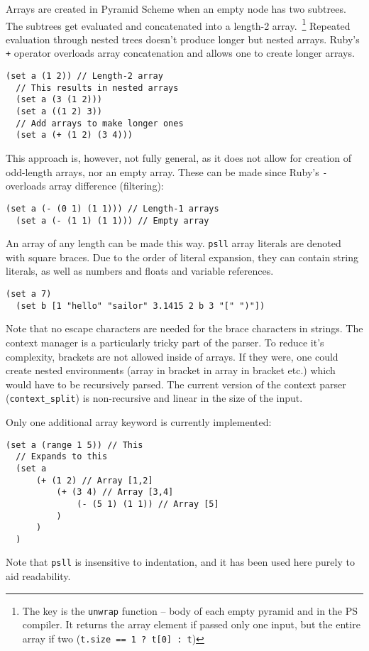 \documentclass[aip,jcp,reprint,footinbib]{revtex4-1}
\makeatletter
\let\tt\texttt
\newcommand\psll{\texttt{psll}\xspace}
\renewcommand\paragraph{\@startsection{paragraph}{4}{\parindent}{\parskip}{-1em}{\normalfont \normalsize \bfseries}}
\makeatother
\begin{document}
\paragraph{Array literals} Arrays are created in Pyramid Scheme when an empty node has two subtrees. The subtrees get evaluated and concatenated into a length-2 array.~\footnote{The key is the \tt{unwrap} function -- body of each empty pyramid and in the PS compiler. It returns the array element if passed only one input, but the entire array if two (\tt{t.size == 1 ? t[0] : t})} Repeated evaluation through nested trees doesn't produce longer but nested arrays. Ruby's \tt{+} operator overloads array concatenation and allows one to create longer arrays.
\begin{lstlisting}[language=psll,aboveskip=3pt,belowskip=-2pt,frame=none,numbers=none]
  (set a (1 2)) // Length-2 array
  // This results in nested arrays
  (set a (3 (1 2)))
  (set a ((1 2) 3))
  // Add arrays to make longer ones
  (set a (+ (1 2) (3 4)))
\end{lstlisting}
This approach is, however, not fully general, as it does not allow for creation of odd-length arrays, nor an empty array. These can be made since Ruby's \tt{-} overloads array difference (filtering):
\begin{lstlisting}[language=psll,aboveskip=3pt,belowskip=-2pt,frame=none,numbers=none]
  (set a (- (0 1) (1 1))) // Length-1 arrays
  (set a (- (1 1) (1 1))) // Empty array
\end{lstlisting}
An array of any length can be made this way. \psll array literals are denoted with square braces. Due to the order of literal expansion, they can contain string literals, as well as numbers and floats and variable references.
\begin{lstlisting}[language=psll,aboveskip=3pt,belowskip=-2pt,frame=none,numbers=none]
  (set a 7)
  (set b [1 "hello" "sailor" 3.1415 2 b 3 "[" ")"])
\end{lstlisting}
Note that no escape characters are needed for the brace characters in strings. 
The context manager is a particularly tricky part of the parser. To reduce it's complexity, brackets are not allowed inside of arrays. If they were, one could create nested environments (array in bracket in array in bracket etc.) which would have to be recursively parsed. The current version of the context parser (\tt{context\_split}) is non-recursive and linear in the size of the input.

Only one additional array keyword is currently implemented:
\begin{lstlisting}[language=psll,aboveskip=3pt,belowskip=-2pt,frame=none,numbers=none]
  (set a (range 1 5)) // This
  // Expands to this
  (set a
      (+ (1 2) // Array [1,2]
          (+ (3 4) // Array [3,4]
              (- (5 1) (1 1)) // Array [5]
          )
      )
  )
\end{lstlisting}
Note that \psll is insensitive to indentation, and it has been used here purely to aid readability.
\end{document}
